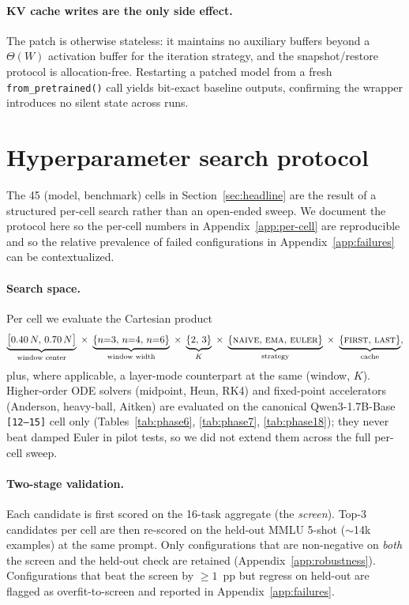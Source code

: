 \paragraph{KV cache writes are the only side effect.}
The patch is otherwise stateless: it maintains no auxiliary buffers beyond a $\Theta(W)$ activation buffer for the iteration strategy, and the snapshot/restore protocol is allocation-free. Restarting a patched model from a fresh \texttt{from\_pretrained()} call yields bit-exact baseline outputs, confirming the wrapper introduces no silent state across runs.

\section{Hyperparameter search protocol}
\label{app:search-protocol}

The 45 (model, benchmark) cells in Section~\ref{sec:headline} are the result of a structured per-cell search rather than an open-ended sweep. We document the protocol here so the per-cell numbers in Appendix~\ref{app:per-cell} are reproducible and so the relative prevalence of failed configurations in Appendix~\ref{app:failures} can be contextualized.

\paragraph{Search space.} Per cell we evaluate the Cartesian product
\begin{equation*}
\underbrace{\bigl[0.40\,N,\,0.70\,N\bigr]}_{\text{window center}}\;\times\;
\underbrace{\{n{=}3,\,n{=}4,\,n{=}6\}}_{\text{window width}}\;\times\;
\underbrace{\{2,\,3\}}_{K}\;\times\;
\underbrace{\{\textsc{naive},\,\textsc{ema},\,\textsc{euler}\}}_{\text{strategy}}\;\times\;
\underbrace{\{\textsc{first},\,\textsc{last}\}}_{\text{cache}},
\end{equation*}
plus, where applicable, a layer-mode counterpart at the same (window, $K$). Higher-order ODE solvers (midpoint, Heun, RK4) and fixed-point accelerators (Anderson, heavy-ball, Aitken) are evaluated on the canonical Qwen3-1.7B-Base \texttt{[12--15]} cell only (Tables~\ref{tab:phase6}, \ref{tab:phase7}, \ref{tab:phase18}); they never beat damped Euler in pilot tests, so we did not extend them across the full per-cell sweep.

\paragraph{Two-stage validation.} Each candidate is first scored on the 16-task aggregate (the \emph{screen}). Top-3 candidates per cell are then re-scored on the held-out MMLU 5-shot ($\sim$14k examples) at the same prompt. Only configurations that are non-negative on \emph{both} the screen and the held-out check are retained (Appendix~\ref{app:robustness}). Configurations that beat the screen by $\ge\!1$~pp but regress on held-out are flagged as overfit-to-screen and reported in Appendix~\ref{app:failures}.

